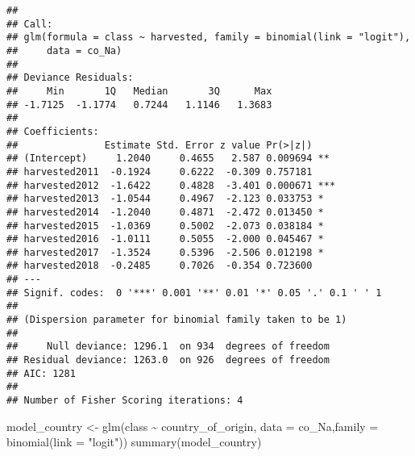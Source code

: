 \documentclass[
]{article}
\newenvironment{Shaded}{\begin{snugshade}}{\end{snugshade}}
\newcommand{\AttributeTok}[1]{\textcolor[rgb]{0.77,0.63,0.00}{#1}}
\newcommand{\FunctionTok}[1]{\textcolor[rgb]{0.00,0.00,0.00}{#1}}
\newcommand{\NormalTok}[1]{#1}
\newcommand{\OtherTok}[1]{\textcolor[rgb]{0.56,0.35,0.01}{#1}}
\newcommand{\SpecialCharTok}[1]{\textcolor[rgb]{0.00,0.00,0.00}{#1}}
\newcommand{\StringTok}[1]{\textcolor[rgb]{0.31,0.60,0.02}{#1}}
\begin{document}
\begin{verbatim}
## 
## Call:
## glm(formula = class ~ harvested, family = binomial(link = "logit"), 
##     data = co_Na)
## 
## Deviance Residuals: 
##     Min       1Q   Median       3Q      Max  
## -1.7125  -1.1774   0.7244   1.1146   1.3683  
## 
## Coefficients:
##               Estimate Std. Error z value Pr(>|z|)    
## (Intercept)     1.2040     0.4655   2.587 0.009694 ** 
## harvested2011  -0.1924     0.6222  -0.309 0.757181    
## harvested2012  -1.6422     0.4828  -3.401 0.000671 ***
## harvested2013  -1.0544     0.4967  -2.123 0.033753 *  
## harvested2014  -1.2040     0.4871  -2.472 0.013450 *  
## harvested2015  -1.0369     0.5002  -2.073 0.038184 *  
## harvested2016  -1.0111     0.5055  -2.000 0.045467 *  
## harvested2017  -1.3524     0.5396  -2.506 0.012198 *  
## harvested2018  -0.2485     0.7026  -0.354 0.723600    
## ---
## Signif. codes:  0 '***' 0.001 '**' 0.01 '*' 0.05 '.' 0.1 ' ' 1
## 
## (Dispersion parameter for binomial family taken to be 1)
## 
##     Null deviance: 1296.1  on 934  degrees of freedom
## Residual deviance: 1263.0  on 926  degrees of freedom
## AIC: 1281
## 
## Number of Fisher Scoring iterations: 4
\end{verbatim}

\begin{Shaded}
\begin{Highlighting}[]
\NormalTok{model\_country }\OtherTok{\textless{}{-}} \FunctionTok{glm}\NormalTok{(class }\SpecialCharTok{\textasciitilde{}}\NormalTok{ country\_of\_origin, }\AttributeTok{data =}\NormalTok{ co\_Na,}\AttributeTok{family =} \FunctionTok{binomial}\NormalTok{(}\AttributeTok{link =} \StringTok{"logit"}\NormalTok{))}
\FunctionTok{summary}\NormalTok{(model\_country)}
\end{Highlighting}
\end{Shaded}
\end{document}
